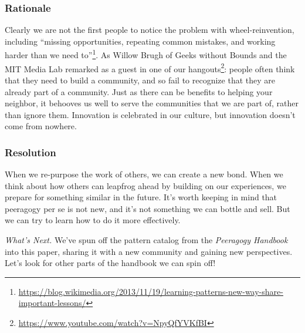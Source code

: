 \subsubsection*{Rationale} 
Clearly we are not the first people to notice the problem with wheel-reinvention, including ``missing opportunities, repeating common mistakes, and working harder than we need to''\footnote{\url{https://blog.wikimedia.org/2013/11/19/learning-patterns-new-way-share-important-lessons/}}.  As Willow Brugh of Geeks without Bounds and the MIT Media Lab remarked as a guest in one of our hangouts\footnote{\url{https://www.youtube.com/watch?v=NpyQfYVKfBI}}: people often think that they need to build a community, and so fail to recognize that they are already part of a community.  Just as there can be benefits to helping your neighbor, it behooves us well to serve the communities that we are part of, rather than ignore them.  Innovation is celebrated in our culture, but innovation doesn't come from nowhere. 

\subsubsection*{Resolution} When we re-purpose the work of others, we can create a new bond.   When we think about how others can leapfrog ahead by building on our experiences, we prepare for something similar in the future.  It's worth keeping in mind that peeragogy per se is not new, and it's not something we can bottle and sell.  But we can try to learn how to do it more effectively.

\begin{framed}
\emph{What's Next.}
We've spun off the pattern catalog from the \emph{Peeragogy Handbook} into this paper, sharing it with a new community and gaining new perspectives.  Let's look for other parts of the handbook we can spin off!
\end{framed}

\endgroup
    
    
    
    
    
    
    